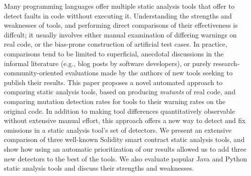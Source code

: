 Many programming languages offer multiple static analysis tools that offer to detect faults in code witthout executing it.  Understanding the strengths and weaknesses of tools, and performing direct comparisons of their effectiveness is diffcult; it usually involves either manual examination of differing warnings on real code, or the bias-prone construction of artificial test cases.  In practice, comparisons tend to be limited to superficial, anecdotal discussions in the informal literature (e.g., blog posts by software developers), or purely research-community-oriented evaluations made by the authors of new tools seeking to publish their results.  This paper proposes a novel automated approach to comparing static analysis tools, based on producing \emph{mutants} of real code, and comparing mutation detection rates for tools to their warning rates on the original code.  In addition to making tool differences quantitatively observable without extensive manual effort, this approach offers a new way to detect and fix omissions in a static analysis tool's set of detectors.  We present an extensive comparison of three well-known Solidity smart contract static analysis tools, and show how using an automatic prioritization of our results allowed us to add three new detectors to the best of the tools.  We also evaluate popular Java and Python static analysis tools and discuss their strengths and weaknesses.